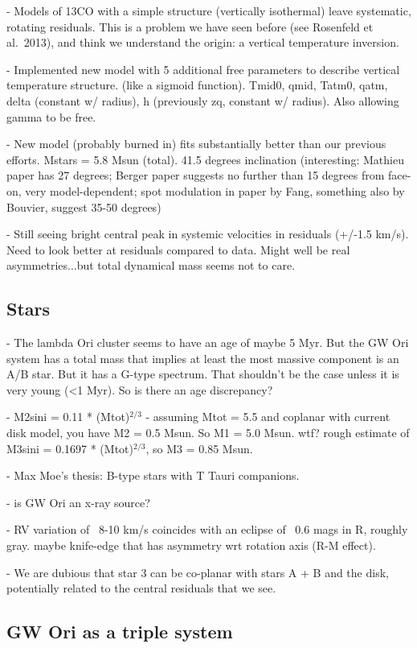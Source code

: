 \documentclass{aastex6}
\begin{document}
- Models of 13CO with a simple structure (vertically isothermal) leave systematic, rotating residuals.  This is a problem we have seen before (see Rosenfeld et al.~2013), and think we understand the origin: a vertical temperature inversion.

- Implemented new model with 5 additional free parameters to describe vertical temperature structure.  (like a sigmoid function).  {Tmid0, qmid, Tatm0, qatm, delta (constant w/ radius), h (previously zq, constant w/ radius)}.  Also allowing gamma to be free.

- New model (probably burned in) fits substantially better than our previous efforts.  Mstars = 5.8 Msun (total).  41.5 degrees inclination (interesting: Mathieu paper has 27 degrees; Berger paper suggests no further than 15 degrees from face-on, very model-dependent; spot modulation in paper by Fang, something also by Bouvier, suggest 35-50 degrees)

- Still seeing bright central peak in systemic velocities in residuals (+/-1.5 km/s).  Need to look better at residuals compared to data.  Might well be real asymmetries...but total dynamical mass seems not to care.


\subsection{Stars}

- The lambda Ori cluster seems to have an age of maybe 5 Myr.  But the GW Ori system has a total mass that implies at least the most massive component is an A/B star.  But it has a G-type spectrum.  That shouldn't be the case unless it is very young (<1 Myr).  So is there an age discrepancy?

- M2sini = 0.11 * (Mtot)$^{2/3}$
- assuming Mtot = 5.5 and coplanar with current disk model, you have M2 = 0.5 Msun.  So M1 = 5.0 Msun.  wtf?  rough estimate of M3sini = 0.1697 * (Mtot)$^{2/3}$, so M3 = 0.85 Msun.

- Max Moe's thesis: B-type stars with T Tauri companions.

- is GW Ori an x-ray source?

- RV variation of ~8-10 km/s coincides with an eclipse of ~0.6 mags in R, roughly gray.  maybe knife-edge that has asymmetry wrt rotation axis (R-M effect).

- We are dubious that star 3 can be co-planar with stars A + B and the disk, potentially related to the central residuals that we see.


\subsection{GW Ori as a triple system}
\end{document}

